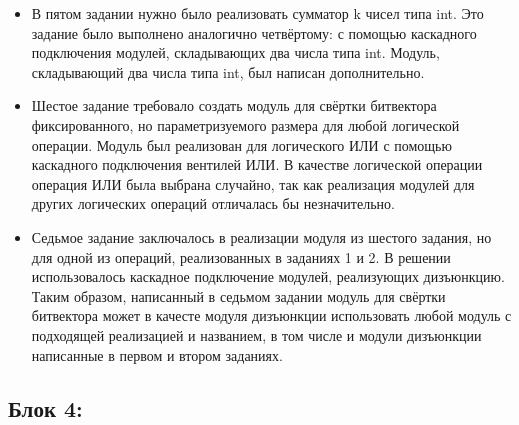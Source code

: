 \documentclass[a4paper]{article}
\begin{document}
\begin{itemize}
    \item В пятом задании нужно было реализовать сумматор k чисел типа int. Это задание было выполнено аналогично четвёртому: с помощью каскадного подключения модулей, складывающих два числа типа int. Модуль, складывающий два числа типа int, был написан дополнительно.

    \item Шестое задание требовало создать модуль для свёртки битвектора фиксированного, но параметризуемого размера для любой логической операции. Модуль был реализован для логического ИЛИ с помощью каскадного подключения вентилей ИЛИ. В качестве логической операции операция ИЛИ была выбрана случайно, так как реализация модулей для других логических операций отличалась бы незначительно.

    \item Седьмое задание заключалось в реализации модуля из шестого задания, но для одной из операций, реализованных в заданиях 1 и 2. В решении использовалось каскадное подключение модулей, реализующих дизъюнкцию. Таким образом, написанный в седьмом задании модуль для свёртки битвектора может в качесте модуля дизъюнкции использовать любой модуль с подходящей реализацией и названием, в том числе и модули дизъюнкции написанные в первом и втором заданиях.
\end{itemize}

\subsection{Блок 4:}
\end{document}
